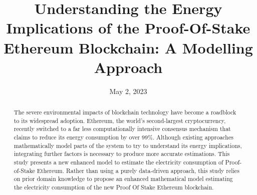 \documentclass[sotoncolour]{uosthesis}      %
\title      {Understanding the Energy Implications of the Proof-Of-Stake Ethereum Blockchain: A Modelling Approach}
\date       {May 2, 2023}
\begin{document}

\justifying                  %
\frontmatter
\maketitle

\begin{abstract}
    The severe environmental impacts of blockchain technology have become a roadblock to its widespread adoption.  Ethereum, the world's second-largest cryptocurrency, recently switched to a far less computationally intensive consensus mechanism that claims to reduce its energy consumption by over 99\%. Although existing approaches mathematically model parts of the system to try to understand its energy implications, integrating further factors is necessary to produce more accurate estimations. This study presents a new enhanced model to estimate the electricity consumption of Proof-of-Stake Ethereum. Rather than using a purely data-driven approach, this study relies on prior domain knowledge to propose an enhanced mathematical model estimating the electricity consumption of the new Proof Of Stake Ethereum blockchain.   
\end{abstract}
\tableofcontents
\listoffigures
\listoftables


\mainmatter %
\end{document}
